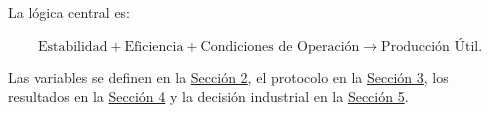 La lógica central es:

\begin{equation}
\text{Estabilidad}
+
\text{Eficiencia}
+
\text{Condiciones de Operación}
\longrightarrow
\text{Producción Útil}.
\end{equation}

Las variables se definen en la \hyperref[sec:variables]{Sección 2}, el protocolo
en la \hyperref[sec:metodologia]{Sección 3}, los resultados en la
\hyperref[sec:evidencia]{Sección 4} y la decisión industrial en la
\hyperref[sec:discusion]{Sección 5}.
